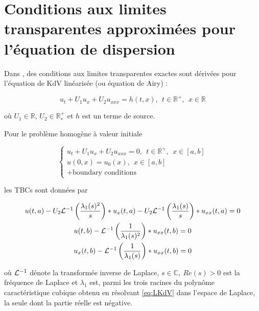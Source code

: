 \section{Conditions aux limites transparentes approximées pour l'équation de dispersion}
\label{sec:TBCKdV}

\indent Dans  \cite{besse2015}, des conditions aux limites transparentes exactes sont dérivées pour l'équation de KdV linéarisée (ou équation de Airy) :

\begin{equation}
 	\label{eq:LKdV}
 	u_t + U_1u_x + U_2u_{xxx} = h(t,x), \ \ t \in \mathbb{R}^+, \ \ x \in \mathbb{R}
\end{equation}

\noindent où $U_1 \in \mathbb{R}$, $U_2 \in \mathbb{R}^+_*$ et $h$ est un terme de source.

\indent Pour le problème homogène à valeur initiale

\begin{equation*}
\begin{cases}
	u_t + U_1u_x + U_2u_{xxx} = 0, \ \ t \in \mathbb{R}^+, \ \ x \in [a,b] \\
	u(0,x) = u_0(x), \ \ x \in [a,b] \\
	+ \text{boundary conditions} \nonumber
\end{cases}
\end{equation*}

\noindent les TBCs sont données \cite[équations 2.17,2.18]{besse2015} par 

\begin{equation}
\label{eq:continuousTBC}
\begin{gathered}
        u(t,a) - U_2 \mathcal{L}^{-1} \left( \frac{\lambda_1(s)^2}{s} \right) * u_x(t,a) - U_2 \mathcal{L}^{-1} \left( \frac{\lambda_1(s)}{s} \right) * u_{xx}(t,a) = 0 \\ 
        u(t,b) - \mathcal{L}^{-1} \left( \frac{1}{\lambda_1(s)^2} \right) * u_{xx}(t,b) = 0 \\
        u_x(t,b) - \mathcal{L}^{-1} \left( \frac{1}{\lambda_1(s)} \right) * u_{xx}(t,b) = 0 
\end{gathered}
\end{equation}

\noindent où $\mathcal{L}^{-1}$ dénote la transformée inverse de Laplace, $s \in \mathbb{C},\ Re(s)>0$ est la fréquence de Laplace et $\lambda_1$ est, parmi les trois racines du polynôme caractéristique cubique obtenu en résolvant \eqref{eq:LKdV} dans l'espace de Laplace, la seule dont la partie réelle est négative. \cite{zheng2008}


